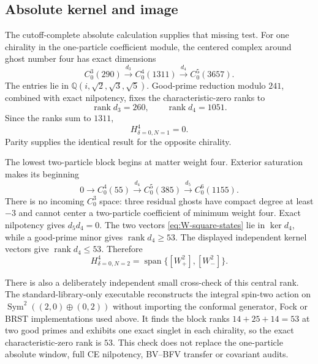 \documentclass[11pt]{article}
\theoremstyle{definition}
\theoremstyle{remark}
\newcommand{\rank}{\operatorname{rank}}
\begin{document}
\subsection{Absolute kernel and image}

The cutoff-complete absolute calculation supplies that missing test.  For
one chirality in the one-particle coefficient module, the centered complex
around ghost number four has exact dimensions
\begin{equation}\label{eq:one-particle-complex}
 C^3_0(290)\xrightarrow{d_3}
 C^4_0(1311)\xrightarrow{d_4}
 C^5_0(3657).
\end{equation}
The entries lie in
$\mathbb Q(i,\sqrt2,\sqrt3,\sqrt5)$.  Good-prime reduction modulo $241$,
combined with exact nilpotency, fixes the characteristic-zero ranks to
\begin{equation}
 \rank d_3=260,
 \qquad \rank d_4=1051.
\end{equation}
Since the ranks sum to $1311$,
\begin{equation}\label{eq:one-particle-zero}
 H^4_{\delta=0,N=1}=0.
\end{equation}
Parity supplies the identical result for the opposite chirality.

The lowest two-particle block begins at matter weight four.  Exterior
saturation makes its beginning
\begin{equation}\label{eq:two-particle-complex}
 0\longrightarrow C^4_0(55)
 \xrightarrow{d_4}C^5_0(385)
 \xrightarrow{d_5}C^6_0(1155).
\end{equation}
There is no incoming $C^3_0$ space: three residual ghosts have compact
degree at least $-3$ and cannot center a two-particle coefficient of minimum
weight four.  Exact nilpotency gives $d_5d_4=0$.
The two vectors \eqref{eq:W-square-states} lie in $\ker d_4$, while a
good-prime minor gives $\rank d_4\ge53$.  The displayed independent kernel
vectors give $\rank d_4\le53$.  Therefore
\begin{equation}\label{eq:two-particle-H}
 H^4_{\delta=0,N=2}
 =\operatorname{span}\{[W_+^2],[W_-^2]\}.
\end{equation}

There is also a deliberately independent small cross-check of this central
rank.  The standard-library-only executable
 reconstructs
the integral spin-two action on
$\operatorname{Sym}^2((2,0)\oplus(0,2))$ without importing the conformal
generator, Fock or BRST implementations used above.  It finds the block ranks
$14+25+14=53$ at two good primes and exhibits one exact singlet in each
chirality, so the exact characteristic-zero rank is $53$.  This check does
not replace the one-particle absolute window, full CE nilpotency, BV--BFV
transfer or covariant audits.
\end{document}
